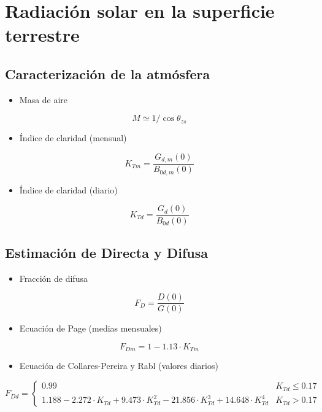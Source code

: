 \documentclass[article, a4paper]{memoir}
\begin{document}
\section{Radiación solar en la superficie terrestre}
\label{sec:org4700f48}
\subsection{Caracterización de la atmósfera}
\label{sec:org455c6c3}

\begin{itemize}
\item Masa de aire
\end{itemize}

\[
   M \simeq 1/\cos\theta_{zs}
\]

\begin{itemize}
\item Índice de claridad (mensual)
\end{itemize}
\[
K_{Tm}=\frac{G_{d,m}(0)}{B_{0d,m}(0)}
\]

\begin{itemize}
\item Índice de claridad (diario)
\end{itemize}
\[
K_{Td}=\frac{G_d(0)}{B_{0d}(0)}
\]

\subsection{Estimación de Directa y Difusa}
\label{sec:org25041bf}

\begin{itemize}
\item Fracción de difusa
\end{itemize}
\[
F_{D}=\frac{D(0)}{G(0)}
\]

\begin{itemize}
\item Ecuación de Page (medias mensuales)
\end{itemize}

\[
F_{Dm}=1-1.13\cdot K_{Tm}
\]
\begin{itemize}
\item Ecuación de Collares-Pereira y Rabl (valores diarios)
\end{itemize}

\[
F_{Dd} = \begin{cases}
  0.99 & K_{Td} \leq 0.17\\
  1.188 - 2.272 \cdot K_{Td} + 9.473 \cdot K_{Td}^{2} - 21.856 \cdot K_{Td}^{3} + 14.648 \cdot K_{Td}^{4} & K_{Td} > 0.17
\end{cases}
\]
\end{document}
